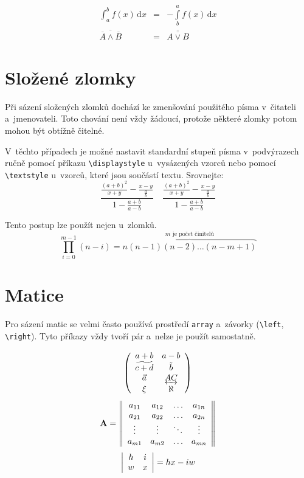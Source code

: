 \documentclass[11pt,a4paper,twocolumn]{article}
\begin{document}
  \begin{eqnarray}
    \int^b_a f(x)\,\mathrm{d}x & = & -\int\limits^a_b f(x)\,\mathrm{d}x                 \\
    \overline{\overline{A}\wedge \overline{B}} & = &  \overline{\overline{A\vee B}}
  \end{eqnarray}

\section{Složené zlomky}
  Při sázení složených zlomků dochází ke zmenšování použitého písma v~čitateli
  a~jmenovateli. Toto chování není vždy žádoucí, protože některé zlomky potom mohou být
  obtížně čitelné.

  V~těchto případech je možné nastavit standardní stupeň písma v~podvýrazech ručně pomocí
  příkazu \verb|\displaystyle| u~vysázených vzorců nebo pomocí \verb|\textstyle| u~vzorců,
  které jsou součástí textu. Srovnejte:
  \[
    \frac{\displaystyle\frac{(a+b)^2}{x+y}-\frac{x-y}{\displaystyle\frac{a}{b}}}
      {1-\displaystyle\frac{a+b}{a-b}}
    \quad
    \frac{\textstyle\frac{(a+b)^2}{x+y}-\frac{x-y}{\frac{a}{b}}}
      {1-\textstyle\frac{a+b}{a-b}}
  \]

  Tento postup lze použít nejen u~zlomků.
  \[
    \prod_{i=0}^{m-1} (n-i) = \overbrace{n(n-1)(n-2) \ldots (n-m+1)}^{\displaystyle m
    \text{ je počet činitelů}}
  \]

\section{Matice}
  Pro sázení matic se velmi často používá prostředí \texttt{array} a~závorky (\verb|\left|,
  \verb|\right|). Tyto příkazy vždy tvoří pár a~nelze je použít samostatně.

  \[
    \left(
      \begin{array}{c c}
        a+b             & a-b                       \\
        \widetilde{c+d} & \tilde{b}                 \\
        \vec{a}         & \underleftrightarrow{AC}  \\
        \xi             & \aleph
      \end{array}
    \right)
  \]
  \[
    \mathbf{A} =
    \left\|
      \begin{array}{c c c c}
        a_{11} & a_{12} & \ldots & a_{1n}  \\
        a_{21} & a_{22} & \ldots & a_{2n}  \\
        \vdots & \vdots & \ddots & \vdots  \\
        a_{m1} & a_{m2} & \ldots & a_{mn}
      \end{array}
    \right\|
  \]
  \[
    \left|
      \begin{array}{c c}
        h & i  \\
        w & x
      \end{array}
    \right| = hx - iw
  \]
\end{document}
